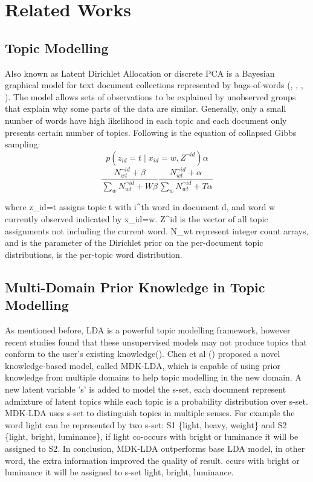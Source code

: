 \documentclass[11pt,twoside]{report}
\begin{document}
\chapter{Related Works}

\section{Topic Modelling}
Also known as Latent Dirichlet Allocation or discrete PCA is a Bayesian graphical model for text document collections represented by bags-of-words (\cite{ref26}, \cite{ref25}, \cite{ref30}, \cite{ref31}). The model allows sets of observations to be explained by unobserved groups that explain why some parts of the data are similar. Generally, only a small number of words have high likelihood in each topic and each document only presents certain number of topics. Following is the equation of collapsed Gibbs sampling:
\begin{equation}
p(z_{id}=t\mid x_{id}=w,Z^{\neg id}) \alpha
\end{equation}
\begin{equation}
\frac{N_{wt}^{\neg id} + \beta}{\sum_{w}N_{wt}^{\neg id} + W\beta} \frac{N_{wt}^{\neg id} + \alpha}{\sum_{w}N_{wt}^{\neg id} + T\alpha}
\end{equation}

where z_{id}=t assigns topic t with i^{th} word in document d, and word w currently observed indicated by x_{id}=w.
Z^{\neg id} is the vector of all topic assignments not including the current word. N_{wt} represent integer count arrays, and \alpha is the parameter of the Dirichlet prior on the per-document topic distributions, \beta is the per-topic word distribution.

\section{Multi-Domain Prior Knowledge in Topic Modelling}
As mentioned before, LDA is a powerful topic modelling framework, however recent studies found that these unsupervised models may not produce topics that conform to the user's existing knowledge(\cite{ref24}). Chen et al (\cite{ref24}) proposed a novel knowledge-based model, called MDK-LDA, which is capable of using prior knowledge from multiple domains to help topic modelling in the new domain. A new latent variable 's' is added to model the s-set, each document represent admixture of latent topics while each topic is a probability distribution over s-set. MDK-LDA uses s-set to distinguish topics in multiple senses. For example the word light can be represented by two s-set: S1 \{light, heavy, weight\} and S2 \{light, bright, luminance\}, if light co-occurs with bright or luminance it will be assigned to S2.
In conclusion, MDK-LDA outperforms base LDA model, in other word, the extra information improved the quality of result. 
ccurs with bright or luminance it will be assigned to s-set {light, bright, luminance}.
\end{document}
